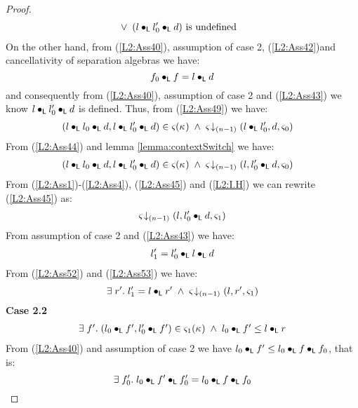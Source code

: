 \begin{lemma}[]
\begin{proof}
\begin{align}
	& \lor\; (l \bullet_{\textsf{L}} l'_0 \bullet_{\textsf{L}} d) \text{ is undefined} \label{L2:Ass49}
\end{align} 
%
On the other hand, from (\ref{L2:Ass40}), assumption of case 2, (\ref{L2:Ass42})and cancellativity of separation algebras we have: 
%
\begin{equation}
	f_0 \bullet_{\textsf{L}} f = l \bullet_{\textsf{L}} d \label{L2:Ass43}
\end{equation}
% 
and consequently from (\ref{L2:Ass40}), assumption of case 2 and (\ref{L2:Ass43}) we know $l \bullet_{\textsf{L}} l'_0 \bullet_{\textsf{L}} d$ is defined. Thus, from (\ref{L2:Ass49}) we have:
%
\begin{align}
	& (l \bullet_{\textsf{L}} l_0 \bullet_{\textsf{L}} d, l \bullet_{\textsf{L}} l'_0 \bullet_{\textsf{L}} d) \in \varsigma_{}(\kappa_{}) \;\land\; \varsigma_{} \!\downarrow_{(n-1)} \left(l \bullet_{\textsf{L}} l'_0, d, \varsigma_{0}\right) \label{L2:Ass44}
\end{align} 
%
From (\ref{L2:Ass44}) and lemma \ref{lemma:contextSwitch} we have:
%
\begin{align}
	& (l \bullet_{\textsf{L}} l_0 \bullet_{\textsf{L}} d, l \bullet_{\textsf{L}} l'_0 \bullet_{\textsf{L}} d) \in \varsigma_{}(\kappa_{}) \;\land\; \varsigma_{} \!\downarrow_{(n-1)} \left(l, l'_0 \bullet_{\textsf{L}} d, \varsigma_{0}\right) \label{L2:Ass45}
\end{align} 
%
From (\ref{L2:Ass1})-(\ref{L2:Ass4}), (\ref{L2:Ass45}) and (\ref{L2:I.H}) we can rewrite (\ref{L2:Ass45}) as:
\begin{align}
	\varsigma_{} \!\downarrow_{(n-1)} \left(l, l'_0 \bullet_{\textsf{L}} d, \varsigma_{1}\right)\label{L2:Ass52}
\end{align}
%
From assumption of case 2 and (\ref{L2:Ass43}) we have:
%
\begin{align}
	l'_1 = l'_0 \bullet_{\textsf{L}} l \bullet_{\textsf{L}} d \label{L2:Ass53}
\end{align}
%
From (\ref{L2:Ass52}) and (\ref{L2:Ass53}) we have:
%
\begin{equation}
	\exists\; r'.\; l'_1 = l \bullet_{\textsf{L}} r' \;\land\; \varsigma_{} \!\downarrow_{(n-1)} \left(l, r', \varsigma_{1}\right)\label{L2:Case2.1}
\end{equation}
%
%
%
%
%
\noindent\textbf{Case 2.2} 
%
\[
\begin{array}{l}
	\exists\; f'.\; (l_0 \bullet_{\textsf{L}} f', l'_0 \bullet_{\textsf{L}} f') \in \varsigma_{1}(\kappa_{}) \;\land\; l_0 \bullet_{\textsf{L}} f' \leq l \bullet_{\textsf{L}} r 
\end{array}
\]
From (\ref{L2:Ass40}) and assumption of case 2 we have $l_0 \bullet_{\textsf{L}} f' \leq l_0 \bullet_{\textsf{L}} f \bullet_{\textsf{L}} f_0$, that is:
%
\begin{equation}
	\exsts{f'_0} l_0 \composeL f' \composeL f'_0 = l_0 \composeL f \composeL f_0 \label{L2:Ass54}

\end{equation}
\end{proof}
\end{lemma}
